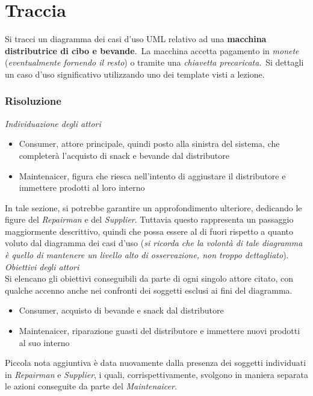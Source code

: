 \documentclass{article}
\begin{document}
\pagestyle{empty}

\section*{Traccia}
\large
Si tracci un diagramma dei casi d’uso UML relativo ad una \textbf{macchina distributrice di cibo e bevande}.\ La macchina accetta pagamento in \textit{monete} (\textit{eventualmente fornendo il resto}) o tramite una \textit{chiavetta precaricata}.\ Si dettagli un caso d’uso significativo utilizzando uno dei template visti a lezione.

\subsubsection*{Risoluzione}
\large
\textit{Individuazione degli attori}
\begin{itemize}[label={-}]
    \item Consumer, attore principale, quindi posto alla sinistra del sistema, che completerà l'acquisto di snack e bevande dal distributore
    \item Maintenaicer, figura che riesca nell'intento di aggiustare il distributore e immettere prodotti al loro interno
\end{itemize}
In tale sezione, si potrebbe garantire un approfondimento ulteriore, dedicando le figure del \textit{Repairman} e del \textit{Supplier}. Tuttavia questo rappresenta un passaggio maggiormente descrittivo, quindi che possa essere al di fuori rispetto a quanto voluto dal diagramma dei casi d'uso (\textit{si ricorda che la volontà di tale diagramma è quello di mantenere un livello alto di osservazione, non troppo dettagliato}).\vspace{14pt}\\
\textit{Obiettivi degli attori}\\
Si elencano gli obiettivi conseguibili da parte di ogni singolo attore citato, con qualche accenno anche nei confronti dei soggetti esclusi ai fini del diagramma.
\begin{itemize}[label={-}]
    \item Consumer, acquisto di bevande e snack dal distributore
    \item Maintenaicer, riparazione guasti del distributore e immettere nuovi prodotti al suo interno
\end{itemize}
Piccola nota aggiuntiva è data nuovamente dalla presenza dei soggetti individuati in \textit{Repairman} e \textit{Supplier}, i quali, corrispettivamente, svolgono in maniera separata le azioni conseguite da parte del \textit{Maintenaicer}.
\end{document}
